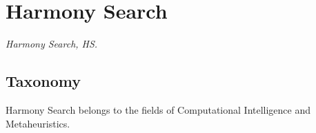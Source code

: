 

\section{Harmony Search} 
\label{sec:harmony_search}

\emph{Harmony Search, HS.}

\subsection{Taxonomy}
Harmony Search belongs to the fields of Computational Intelligence and Metaheuristics.

